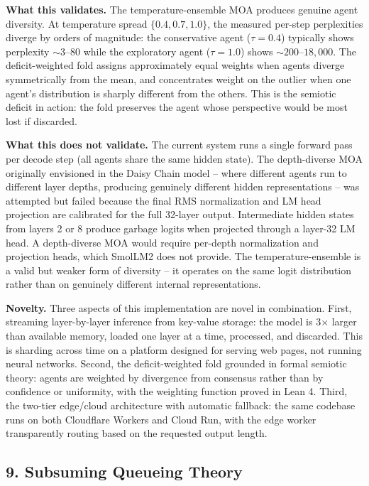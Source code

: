 \documentclass[
  11pt,
]{article}
\begin{document}
\textbf{What this validates.} The temperature-ensemble MOA produces
genuine agent diversity. At temperature spread \(\{0.4, 0.7, 1.0\}\),
the measured per-step perplexities diverge by orders of magnitude: the
conservative agent (\(\tau = 0.4\)) typically shows perplexity
\(\sim 3\)--\(80\) while the exploratory agent (\(\tau = 1.0\)) shows
\(\sim 200\)--\(18{,}000\). The deficit-weighted fold assigns
approximately equal weights when agents diverge symmetrically from the
mean, and concentrates weight on the outlier when one agent's
distribution is sharply different from the others. This is the semiotic
deficit in action: the fold preserves the agent whose perspective would
be most lost if discarded.

\textbf{What this does not validate.} The current system runs a single
forward pass per decode step (all agents share the same hidden state).
The depth-diverse MOA originally envisioned in the Daisy Chain model --
where different agents run to different layer depths, producing
genuinely different hidden representations -- was attempted but failed
because the final RMS normalization and LM head projection are
calibrated for the full 32-layer output. Intermediate hidden states from
layers 2 or 8 produce garbage logits when projected through a layer-32
LM head. A depth-diverse MOA would require per-depth normalization and
projection heads, which SmolLM2 does not provide. The
temperature-ensemble is a valid but weaker form of diversity -- it
operates on the same logit distribution rather than on genuinely
different internal representations.

\textbf{Novelty.} Three aspects of this implementation are novel in
combination. First, streaming layer-by-layer inference from key-value
storage: the model is 3\(\times\) larger than available memory, loaded
one layer at a time, processed, and discarded. This is sharding across
time on a platform designed for serving web pages, not running neural
networks. Second, the deficit-weighted fold grounded in formal semiotic
theory: agents are weighted by divergence from consensus rather than by
confidence or uniformity, with the weighting function proved in Lean 4.
Third, the two-tier edge/cloud architecture with automatic fallback: the
same codebase runs on both Cloudflare Workers and Cloud Run, with the
edge worker transparently routing based on the requested output length.

\subsection{9. Subsuming Queueing
Theory}\label{subsuming-queueing-theory}
\end{document}
